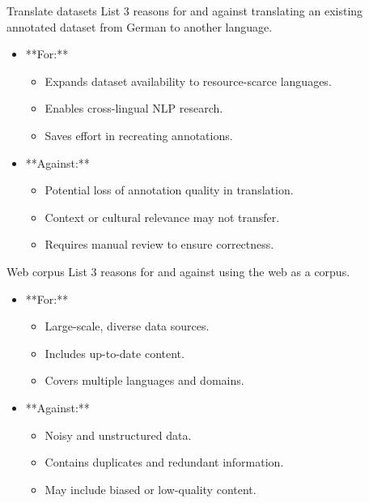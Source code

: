 \documentclass{article}
\begin{document}
\begin{exercise}{Translate datasets}
  List 3 reasons for and against translating an existing annotated dataset from German to another language.

  \begin{solution}
    \begin{itemize}
        \item **For:**
        \begin{itemize}
            \item Expands dataset availability to resource-scarce languages.
            \item Enables cross-lingual NLP research.
            \item Saves effort in recreating annotations.
        \end{itemize}
        \item **Against:**
        \begin{itemize}
            \item Potential loss of annotation quality in translation.
            \item Context or cultural relevance may not transfer.
            \item Requires manual review to ensure correctness.
        \end{itemize}
    \end{itemize}
  \end{solution}
\end{exercise}

\begin{exercise}{Web corpus}
  List 3 reasons for and against using the web as a corpus.

  \begin{solution}
    \begin{itemize}
        \item **For:**
        \begin{itemize}
            \item Large-scale, diverse data sources.
            \item Includes up-to-date content.
            \item Covers multiple languages and domains.
        \end{itemize}
        \item **Against:**
        \begin{itemize}
            \item Noisy and unstructured data.
            \item Contains duplicates and redundant information.
            \item May include biased or low-quality content.
        \end{itemize}
    \end{itemize}
  \end{solution}
\end{exercise}
\end{document}
